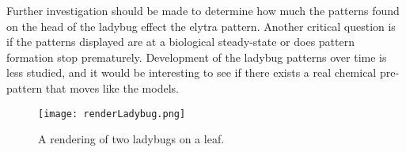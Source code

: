 Further investigation should be made to determine how much the patterns found on the head of the ladybug effect the elytra pattern. Another critical question is if the patterns displayed are at a biological steady-state or does pattern formation stop prematurely. Development of the ladybug patterns over time is less studied, and it would be interesting to see if there exists a real chemical pre-pattern that moves like the models.


\begin{figure}[p]
	\centering
	\texttt{[image: renderLadybug.png]}
	\caption[A rendering of two ladybugs on a leaf]{A rendering of two ladybugs on a leaf.}
	\label{fig:ladybugRender}
\end{figure}